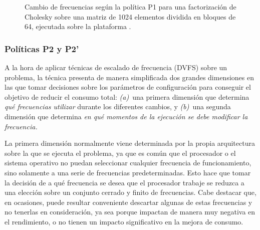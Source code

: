 \begin{figure}
  \centering
  \caption[Cambio de frecuencias según la política P1]{Cambio de
    frecuencias según la política P1 para una factorización de Cholesky
    sobre una matriz de 1024 elementos dividida en bloques de 64, ejecutada
    sobre la plataforma \juno.}
  \label{s5:fig:P1-evo}
\end{figure}

\subsubsection{Políticas P2 y P2'}

A la hora de aplicar técnicas de escalado de frecuencia (DVFS) sobre un problema, la técnica
presenta de manera simplificada dos grandes dimensiones en las que tomar
decisiones sobre los parámetros de configuración para conseguir el objetivo
de reducir el consumo total: {\em (a)}~una primera dimensión que determina {\em qué
frecuencias utilizar} durante los diferentes cambios, y {\em (b)}~una segunda
dimensión que determina {\em en qué momentos de la ejecución se debe modificar
la frecuencia.}

La primera dimensión normalmente viene determinada por la propia arquitectura
sobre la que se ejecuta el problema, ya que es común que el procesador o el sistema operativo no
puedan seleccionar cualquier frecuencia de funcionamiento, sino solamente a una serie de
frecuencias predeterminadas. Esto hace que tomar la decisión de a
qué frecuencia se desea que el procesador trabaje se reduzca a 
una elección sobre un conjunto cerrado y finito de frecuencias. Cabe destacar que,
en ocasiones, puede resultar conveniente descartar algunas de estas frecuencias y
no tenerlas en consideración, ya sea porque impactan de manera muy negativa
en el rendimiento, o no tienen un impacto significativo en la mejora de
consumo.

